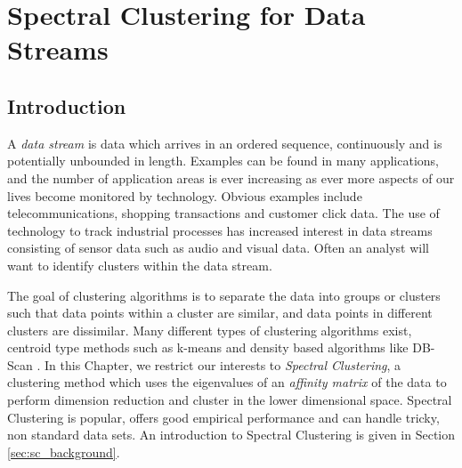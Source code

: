 
% 
\graphicspath{{Chapter2/figures/}} 

\chapter{Spectral Clustering for Data Streams}
\label{chap:spectral}
\section{Introduction}
\label{sec:datastreams_intro}

A \textit{data stream} \citep{Gama2010, Silva2013} is data which arrives in an ordered sequence, continuously and is potentially unbounded in length. Examples can be found in many applications, and the number of application areas is ever increasing as ever more aspects of our lives become monitored by technology. Obvious examples include telecommunications, shopping transactions and customer click data. The use of technology to track industrial processes has increased interest in data streams consisting of sensor data such as audio and visual data. Often an analyst will want to identify clusters within the data stream.

The goal of clustering algorithms is to separate the data into groups or clusters such that data points within a cluster are similar, and data points in different clusters are dissimilar. Many different types of clustering algorithms exist, centroid type methods such as k-means \citep{MacQueen1967, Lloyd1982} and density based algorithms like DB-Scan \citep{Ester1996}. In this Chapter, we restrict our interests to \textit{Spectral Clustering}, a clustering method which uses the eigenvalues of an \textit{affinity matrix} of the data to perform dimension reduction and cluster in the lower dimensional space. Spectral Clustering is popular, offers good empirical performance and can handle tricky, non standard data sets. An introduction to Spectral Clustering is given in Section \ref{sec:sc_background}. 

